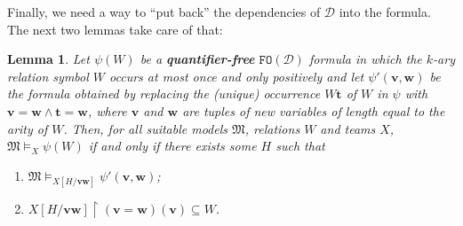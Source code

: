 \documentclass{article}
\newtheorem{Lemma}[Theorem]{Lemma}
\theoremstyle{definition}
\newcommand{\tuple}{\mathbf}
\newcommand{\FO}{\texttt{FO}}
\newcommand{\M}{\mathfrak M}
\newcommand{\DD}{\mathcal D}
\begin{document}
Finally, we need a way to ``put back'' the dependencies of $\DD$ into the formula. The next two lemmas take care of that: 
\begin{Lemma}
	Let $\psi(W)$ be a \textbf{quantifier-free} $\FO(\DD)$ formula in which the $k$-ary relation symbol $W$ occurs at most once and only positively and let $\psi'(\tuple v, \tuple w)$ be the formula obtained by replacing the (unique) occurrence $W \tuple t$ of $W$ in $\psi$ with $\tuple v = \tuple w \wedge \tuple t = \tuple w$, where $\tuple v$ and $\tuple w$ are tuples of new variables of length equal to the arity of $W$. Then, for all suitable models $\M$, relations $W$ and teams $X$,  $\M \models_X \psi(W)$ if and only if there exists some $H$ such that 
	\begin{enumerate}
		\item $\M \models_{X[H/\tuple v \tuple w]} \psi'(\tuple v, \tuple w)$; 
		\item $X[H/\tuple v \tuple w]\upharpoonright (\tuple v = \tuple w)(\tuple v) \subseteq W$. 
	\end{enumerate}
	\label{lemma:qfree}
\end{Lemma}
\end{document}
